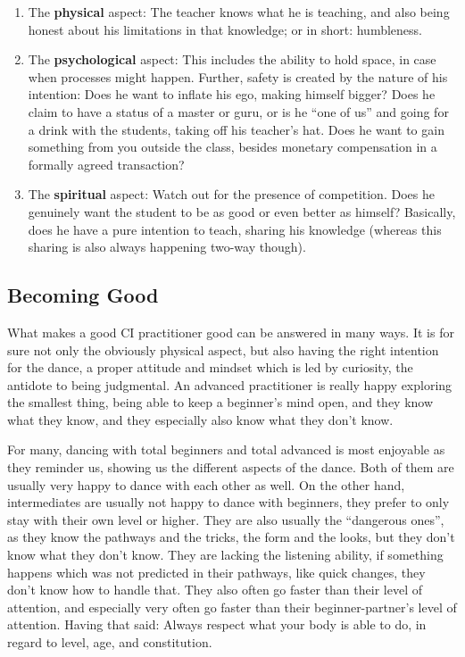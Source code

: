 \begin{enumerate}
    \item The \textbf{physical} aspect: The teacher knows what he is teaching, and also being honest about his limitations in that knowledge; or in short: humbleness.
    \item The \textbf{psychological} aspect: This includes the ability to hold space, in case when processes might happen.
    Further, safety is created by the nature of his intention: Does he want to inflate his ego, making himself bigger?
    Does he claim to have a status of a master or guru, or is he ``one of us'' and going for a drink with the students, taking off his teacher's hat.
    Does he want to gain something from you outside the class, besides monetary compensation in a formally agreed transaction?
    \item The \textbf{spiritual} aspect: Watch out for the presence of competition.
    Does he genuinely want the student to be as good or even better as himself?
    Basically, does he have a pure intention to teach, sharing his knowledge (whereas this sharing is also always happening two-way though).
\end{enumerate}

\subsection{Becoming Good}\label{subsec:becoming-good}

What makes a good CI practitioner good can be answered in many ways.
It is for sure not only the obviously physical aspect, but also having the right intention for the dance, a proper attitude and mindset which is led by curiosity, the antidote to being judgmental.
An advanced practitioner is really happy exploring the smallest thing, being able to keep a beginner's mind open, and they know what they know, and they especially also know what they don't know.

For many, dancing with total beginners and total advanced is most enjoyable as they reminder us, showing us the different aspects of the dance.
Both of them are usually very happy to dance with each other as well.
On the other hand, intermediates are usually not happy to dance with beginners, they prefer to only stay with their own level or higher.
They are also usually the ``dangerous ones'', as they know the pathways and the tricks, the form and the looks, but they don't know what they don't know.
They are lacking the listening ability, if something happens which was not predicted in their pathways, like quick changes, they don't know how to handle that.
They also often go faster than their level of attention, and especially very often go faster than their beginner-partner's level of attention.
Having that said: Always respect what your body is able to do, in regard to level, age, and constitution.


